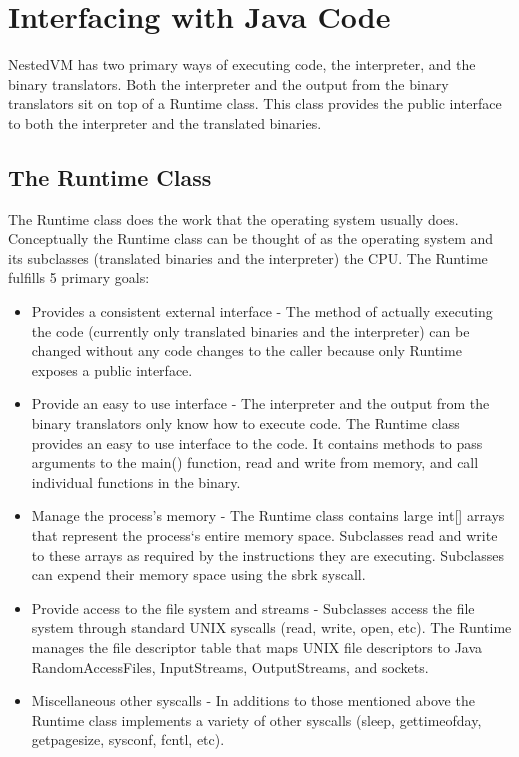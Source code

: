 \documentclass{acmconf}
\begin{document}
\section{Interfacing with Java Code}

NestedVM has two primary ways of executing code, the interpreter, and the
binary translators. Both the interpreter and the output from the binary
translators sit on top of a Runtime class. This class provides the public
interface to both the interpreter and the translated binaries.

\subsection{The Runtime Class}

The Runtime class does the work that the operating system usually does.
Conceptually the Runtime class can be thought of as the operating system and
its subclasses (translated binaries and the interpreter) the CPU. The
Runtime fulfills 5 primary goals:

\begin{itemize}

\item Provides a consistent external interface - The method of actually
executing the code (currently only translated binaries and the interpreter)
can be changed without any code changes to the caller because only Runtime
exposes a public interface.

\item Provide an easy to use interface - The interpreter and the output from
the binary translators only know how to execute code. The Runtime class
provides an easy to use interface to the code. It contains methods to pass
arguments to the main() function, read and write from memory, and call
individual functions in the binary.

\item Manage the process's memory - The Runtime class contains large int[]
arrays that represent the process`s entire memory space.  Subclasses read
and write to these arrays as required by the instructions they are
executing.  Subclasses can expend their memory space using the sbrk
syscall.

\item Provide access to the file system and streams - Subclasses access the
file system through standard UNIX syscalls (read, write, open, etc). The
Runtime manages the file descriptor table that maps UNIX file descriptors
to Java RandomAccessFiles, InputStreams, OutputStreams, and sockets.

\item Miscellaneous other syscalls - In additions to those mentioned above
the Runtime class implements a variety of other syscalls (sleep,
gettimeofday, getpagesize, sysconf, fcntl, etc).

\end{itemize}
\end{document}
